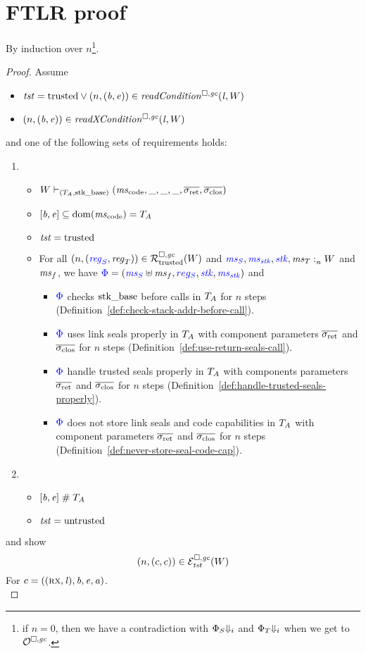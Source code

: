 \documentclass[a4paper]{article}
\begin{document}
\section{FTLR proof}
By induction over $n$\footnote{if $n=0$, then we have a contradiction with $\Phi_S\term[i]$ and $\Phi_T\term[i]$ when we get to $\lro$.}.
\begin{proof}
  Assume
  \begin{itemize}
  \item $\trust = \trusted \vee \npair{(\baddr,\eaddr)} \in \readCond{\lin,W}$
  \item $\npair{(\baddr,\eaddr)} \in \xReadCond{\lin,W}$
  \end{itemize}
  and one of the following sets of requirements holds:
  \begin{enumerate}[label={\roman*)}]
  \item \begin{itemize}
    \item $W \vdash_{(\ta,\stkb)} (\mscode,\_,\_,\_,\sigrets,\sigcloss)$
    \item $[\baddr,\eaddr] \subseteq \dom(\mscode) = \ta$
    \item $\trust = \trusted$
    \item For all $\npair{\stpair{\reg}{\reg}} \in \lrrtrusted(W)$ and $\memSat{\src{\ms_S},\src{\ms_\stk},\src{\stk},\ms_T}{W}$ and $\ms_f$, we have $\src{\Phi} = (\src{\ms_S} \uplus \ms_f, \src{reg_S}, \src{\stk}, \src{\ms_\stk})$ and 
      \begin{itemize}           
      \item $\src{\Phi}$ checks $\stkb$ before calls in $\ta$ for $n$ steps (Definition~\ref{def:check-stack-addr-before-call}).
      \item $\src{\Phi}$ uses link seals properly in $\ta$ with component parameters $\sigrets$ and $\sigcloss$ for $n$ steps (Definition~\ref{def:use-return-seals-call}).
      \item $\src{\Phi}$ handle trusted seals properly in $\ta$ with components parameters $\sigrets$ and $\sigcloss$ for $n$ steps (Definition~\ref{def:handle-trusted-seals-properly}).
      \item $\src{\Phi}$ does not store link seals and code capabilities in $\ta$ with component parameters $\sigrets$ and $\sigcloss$ for $n$ steps (Definition~\ref{def:never-store-seal-code-cap}).
      \end{itemize}
    \end{itemize}
  \item
    \begin{itemize}
    \item $[\baddr,\eaddr] \mathrel{\#} \ta$
    \item $\trust = \untrusted$
    \end{itemize}
  \end{enumerate}
and show
\[
\npair{(c,c)} \in \lreg{\trust}(W)
\]
For $c=((\rx,\lin),\baddr,\eaddr,\aaddr)$.\\


\end{proof}
\end{document}
